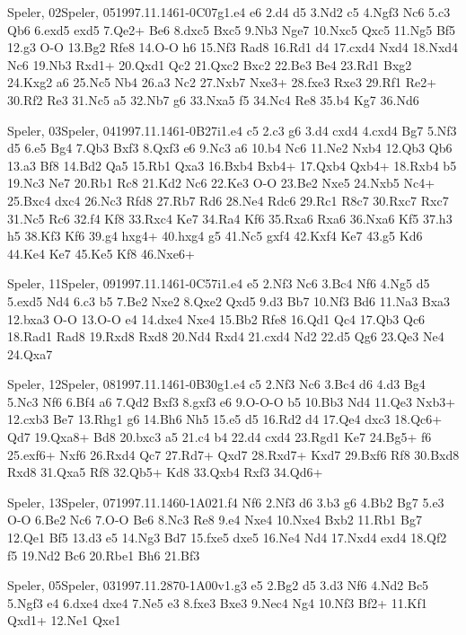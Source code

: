 \documentclass[twocolumn,a4paper,10pt]{report}
\begin{document}
\begin{chessgame}{Speler, 02}{Speler, 05}{1997.11.14}{6}{1-0}{C07g}{1.e4 e6 2.d4 d5 3.Nd2 c5 4.Ngf3 Nc6 5.c3 Qb6 6.exd5 exd5 7.Qe2+ Be6 8.dxc5 Bxc5 9.Nb3 Nge7 10.Nxc5 Qxc5 11.Ng5 Bf5 12.g3 O-O 13.Bg2 Rfe8 14.O-O h6 15.Nf3 Rad8 16.Rd1 d4 17.cxd4 Nxd4 18.Nxd4 Nc6 19.Nb3 Rxd1+ 20.Qxd1 Qc2 21.Qxc2 Bxc2 22.Be3 Be4 23.Rd1 Bxg2 24.Kxg2 a6 25.Nc5 Nb4 26.a3 Nc2 27.Nxb7 Nxe3+ 28.fxe3 Rxe3 29.Rf1 Re2+ 30.Rf2 Re3 31.Nc5 a5 32.Nb7 g6 33.Nxa5 f5 34.Nc4 Re8 35.b4 Kg7 36.Nd6}\end{chessgame}
\begin{chessgame}{Speler, 03}{Speler, 04}{1997.11.14}{6}{1-0}{B27i}{1.e4 c5 2.c3 g6 3.d4 cxd4 4.cxd4 Bg7 5.Nf3 d5 6.e5 Bg4 7.Qb3 Bxf3 8.Qxf3 e6 9.Nc3 a6 10.b4 Nc6 11.Ne2 Nxb4 12.Qb3 Qb6 13.a3 Bf8 14.Bd2 Qa5 15.Rb1 Qxa3 16.Bxb4 Bxb4+ 17.Qxb4 Qxb4+ 18.Rxb4 b5 19.Nc3 Ne7 20.Rb1 Rc8 21.Kd2 Nc6 22.Ke3 O-O 23.Be2 Nxe5 24.Nxb5 Nc4+ 25.Bxc4 dxc4 26.Nc3 Rfd8 27.Rb7 Rd6 28.Ne4 Rdc6 29.Rc1 R8c7 30.Rxc7 Rxc7 31.Nc5 Rc6 32.f4 Kf8 33.Rxc4 Ke7 34.Ra4 Kf6 35.Rxa6 Rxa6 36.Nxa6 Kf5 37.h3 h5 38.Kf3 Kf6 39.g4 hxg4+ 40.hxg4 g5 41.Nc5 gxf4 42.Kxf4 Ke7 43.g5 Kd6 44.Ke4 Ke7 45.Ke5 Kf8 46.Nxe6+}\end{chessgame}
\begin{chessgame}{Speler, 11}{Speler, 09}{1997.11.14}{6}{1-0}{C57i}{1.e4 e5 2.Nf3 Nc6 3.Bc4 Nf6 4.Ng5 d5 5.exd5 Nd4 6.c3 b5 7.Be2 Nxe2 8.Qxe2 Qxd5 9.d3 Bb7 10.Nf3 Bd6 11.Na3 Bxa3 12.bxa3 O-O 13.O-O e4 14.dxe4 Nxe4 15.Bb2 Rfe8 16.Qd1 Qc4 17.Qb3 Qc6 18.Rad1 Rad8 19.Rxd8 Rxd8 20.Nd4 Rxd4 21.cxd4 Nd2 22.d5 Qg6 23.Qe3 Ne4 24.Qxa7}\end{chessgame}
\begin{chessgame}{Speler, 12}{Speler, 08}{1997.11.14}{6}{1-0}{B30g}{1.e4 c5 2.Nf3 Nc6 3.Bc4 d6 4.d3 Bg4 5.Nc3 Nf6 6.Bf4 a6 7.Qd2 Bxf3 8.gxf3 e6 9.O-O-O b5 10.Bb3 Nd4 11.Qe3 Nxb3+ 12.cxb3 Be7 13.Rhg1 g6 14.Bh6 Nh5 15.e5 d5 16.Rd2 d4 17.Qe4 dxc3 18.Qc6+ Qd7 19.Qxa8+ Bd8 20.bxc3 a5 21.c4 b4 22.d4 cxd4 23.Rgd1 Ke7 24.Bg5+ f6 25.exf6+ Nxf6 26.Rxd4 Qc7 27.Rd7+ Qxd7 28.Rxd7+ Kxd7 29.Bxf6 Rf8 30.Bxd8 Rxd8 31.Qxa5 Rf8 32.Qb5+ Kd8 33.Qxb4 Rxf3 34.Qd6+}\end{chessgame}
\begin{chessgame}{Speler, 13}{Speler, 07}{1997.11.14}{6}{0-1}{A02}{1.f4 Nf6 2.Nf3 d6 3.b3 g6 4.Bb2 Bg7 5.e3 O-O 6.Be2 Nc6 7.O-O Be6 8.Nc3 Re8 9.e4 Nxe4 10.Nxe4 Bxb2 11.Rb1 Bg7 12.Qe1 Bf5 13.d3 e5 14.Ng3 Bd7 15.fxe5 dxe5 16.Ne4 Nd4 17.Nxd4 exd4 18.Qf2 f5 19.Nd2 Bc6 20.Rbe1 Bh6 21.Bf3}\end{chessgame}
\begin{chessgame}{Speler, 05}{Speler, 03}{1997.11.28}{7}{0-1}{A00v}{1.g3 e5 2.Bg2 d5 3.d3 Nf6 4.Nd2 Bc5 5.Ngf3 e4 6.dxe4 dxe4 7.Ne5 e3 8.fxe3 Bxe3 9.Nec4 Ng4 10.Nf3 Bf2+ 11.Kf1 Qxd1+ 12.Ne1 Qxe1\mate}\end{chessgame}
\end{document}

